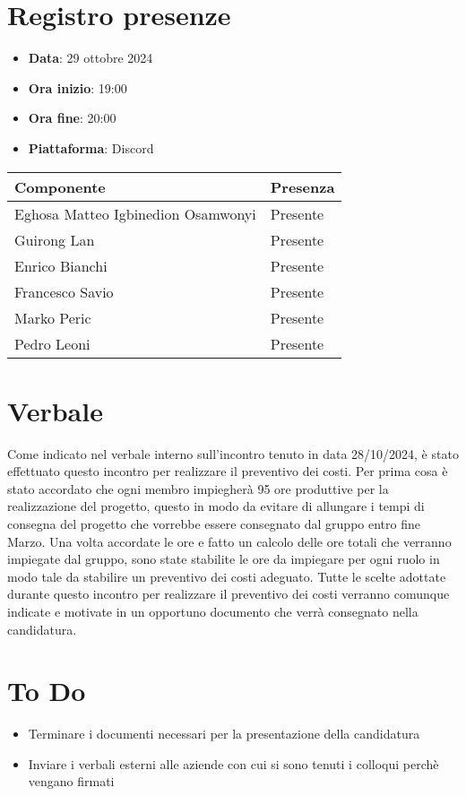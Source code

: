 \documentclass[a4paper, 12pt]{article}
\begin{document}
\section{Registro presenze}
\begin{itemize}
    \item[] \textbf{Data}: 29 ottobre 2024
    \item[] \textbf{Ora inizio}:  19:00
    \item[] \textbf{Ora fine}: 20:00
    \item[] \textbf{Piattaforma}: Discord	
\end{itemize}
\begin{table}[!h]
\centering
{\renewcommand{\arraystretch}{2}
\begin{tabularx}{\textwidth}{| X | X |}
    \hline
        \textbf{\large Componente} & 
        \textbf{\large Presenza} \\ 
    \hline 
    \hline
        Eghosa Matteo Igbinedion Osamwonyi&
        Presente \\
    \hline 
        Guirong Lan&
        Presente \\
    \hline 
        Enrico Bianchi&
        Presente \\
    \hline 
        Francesco Savio&
        Presente \\
    \hline 
        Marko Peric&
        Presente \\
    \hline 
        Pedro Leoni&
        Presente \\
    \hline 

\end{tabularx}}
\end{table}

\newpage

\section{Verbale}
Come indicato nel verbale interno sull'incontro tenuto in data 28/10/2024, è stato effettuato questo incontro per realizzare il preventivo dei costi.
Per prima cosa è stato accordato che ogni membro impiegherà 95 ore produttive per la realizzazione del progetto, questo in modo da evitare di allungare i tempi di consegna del progetto che vorrebbe essere consegnato dal gruppo entro fine Marzo.
Una volta accordate le ore e fatto un calcolo delle ore totali che verranno impiegate dal gruppo, sono state stabilite le ore da impiegare per ogni ruolo in modo tale da stabilire un preventivo dei costi adeguato.
Tutte le scelte adottate durante questo incontro per realizzare il preventivo dei costi verranno comunque indicate e motivate in un opportuno documento che verrà consegnato nella candidatura.
\section{To Do}
\begin{itemize}
    \item Terminare i documenti necessari per la presentazione della candidatura
    \item Inviare i verbali esterni alle aziende con cui si sono tenuti i colloqui perchè vengano firmati
\end{itemize}
\end{document}
